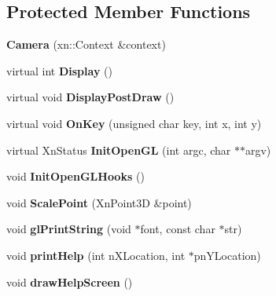 \subsection*{Protected Member Functions}
\begin{DoxyCompactItemize}
\item 
\hypertarget{classCamera_a745fb1420d3fac0d9fa2b4fdebdbe2ec}{{\bfseries Camera} (xn\-::\-Context \&context)}\label{classCamera_a745fb1420d3fac0d9fa2b4fdebdbe2ec}

\item 
\hypertarget{classCamera_a02c5b1e3137cf91a17c9ac1c77e1e134}{virtual int {\bfseries Display} ()}\label{classCamera_a02c5b1e3137cf91a17c9ac1c77e1e134}

\item 
\hypertarget{classCamera_a748e66e97a91728f28ee375444ab1b3c}{virtual void {\bfseries Display\-Post\-Draw} ()}\label{classCamera_a748e66e97a91728f28ee375444ab1b3c}

\item 
\hypertarget{classCamera_af81998562ee82d0815176296a4601159}{virtual void {\bfseries On\-Key} (unsigned char key, int x, int y)}\label{classCamera_af81998562ee82d0815176296a4601159}

\item 
\hypertarget{classCamera_ac98e40fcc6ff6bb43290302bf8c3e04b}{virtual Xn\-Status {\bfseries Init\-Open\-G\-L} (int argc, char $\ast$$\ast$argv)}\label{classCamera_ac98e40fcc6ff6bb43290302bf8c3e04b}

\item 
\hypertarget{classCamera_a2851c66b6f2f9a4b7526350bd9b1a7ef}{void {\bfseries Init\-Open\-G\-L\-Hooks} ()}\label{classCamera_a2851c66b6f2f9a4b7526350bd9b1a7ef}

\item 
\hypertarget{classCamera_a87d82439fc1588db3042fb2ad3c5db41}{void {\bfseries Scale\-Point} (Xn\-Point3\-D \&point)}\label{classCamera_a87d82439fc1588db3042fb2ad3c5db41}

\item 
\hypertarget{classCamera_a725592bf7b931eac09f8b102ea485cfe}{void {\bfseries gl\-Print\-String} (void $\ast$font, const char $\ast$str)}\label{classCamera_a725592bf7b931eac09f8b102ea485cfe}

\item 
\hypertarget{classCamera_a5eaafbf56e1762d806c48de70dad2901}{void {\bfseries print\-Help} (int n\-X\-Location, int $\ast$pn\-Y\-Location)}\label{classCamera_a5eaafbf56e1762d806c48de70dad2901}

\item 
\hypertarget{classCamera_a0c79141b8974f4acc4ae3a5495e24099}{void {\bfseries draw\-Help\-Screen} ()}\label{classCamera_a0c79141b8974f4acc4ae3a5495e24099}

\end{DoxyCompactItemize}

